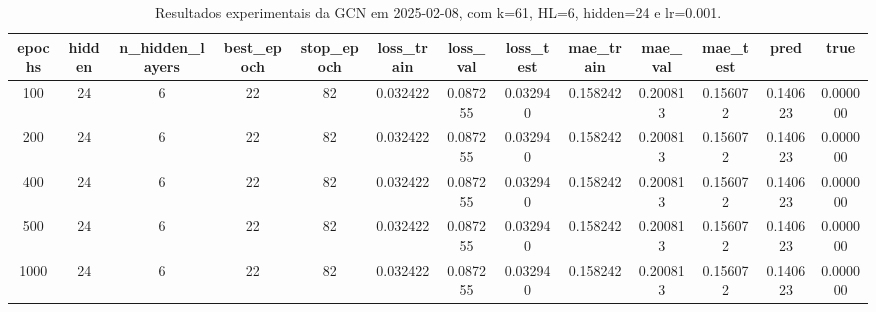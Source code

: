 \begin{table}[h]
\centering
\caption{Resultados experimentais da GCN em 2025-02-08, com k=61, HL=6, hidden=24 e lr=0.001.}
\label{tab:gcn_results_k61_hl6_h24_d20250208}
\begin{tabular}{ccccccccccccc}
\toprule
epochs & hidden & n\_hidden\_layers & best\_epoch & stop\_epoch & loss\_train & loss\_val & loss\_test & mae\_train & mae\_val & mae\_test & pred & true \\
\midrule
100 & 24 & 6 & 22 & 82 & 0.032422 & 0.087255 & 0.032940 & 0.158242 & 0.200813 & 0.156072 & 0.140623 & 0.000000 \\
200 & 24 & 6 & 22 & 82 & 0.032422 & 0.087255 & 0.032940 & 0.158242 & 0.200813 & 0.156072 & 0.140623 & 0.000000 \\
400 & 24 & 6 & 22 & 82 & 0.032422 & 0.087255 & 0.032940 & 0.158242 & 0.200813 & 0.156072 & 0.140623 & 0.000000 \\
500 & 24 & 6 & 22 & 82 & 0.032422 & 0.087255 & 0.032940 & 0.158242 & 0.200813 & 0.156072 & 0.140623 & 0.000000 \\
1000 & 24 & 6 & 22 & 82 & 0.032422 & 0.087255 & 0.032940 & 0.158242 & 0.200813 & 0.156072 & 0.140623 & 0.000000 \\
\bottomrule
\end{tabular}
\end{table}
